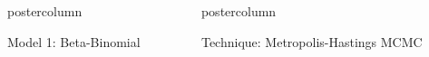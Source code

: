 \documentclass[final]{beamer}\usepackage[]{graphicx}\usepackage[]{color}
\newlength{\columnheight}\setlength{\columnheight}{75cm} %
\begin{document}
{\begin{frame}
\begin{columns}
\begin{column}{.33\textwidth}
\begin{beamercolorbox}[center,wd=\textwidth]{postercolumn}
\begin{minipage}[T]{.97\textwidth}
{\begin{block}{Model 1: Beta-Binomial}
\end{block}
}
\end{minipage}
\end{beamercolorbox}
\end{column}
\begin{column}{.33\textwidth}
\begin{beamercolorbox}[center,wd=\textwidth]{postercolumn}
\begin{minipage}[T]{.97\textwidth} %
\parbox[t][\columnheight]{\textwidth}{ %



\begin{block}{Technique: Metropolis-Hastings MCMC}


\begin{minipage}[T]{.97\textwidth}
	

\end{minipage}
\end{block}}
\end{minipage}
\end{beamercolorbox}
\end{column}
\end{columns}
\end{frame}}
\end{document}
